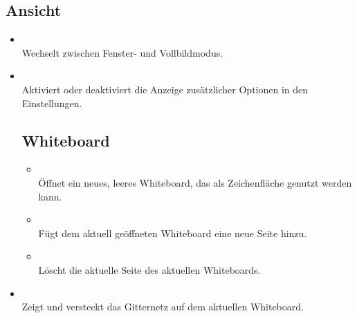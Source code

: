 \subsection{Ansicht}
\begin{itemize}
\item {}\\Wechselt zwischen Fenster- und Vollbildmodus.
\item {}\\Aktiviert oder deaktiviert die Anzeige zusätzlicher Optionen in den Einstellungen.
\subsection{Whiteboard}
\begin{itemize}
\item {}\\Öffnet ein neues, leeres Whiteboard, das als Zeichenfläche genutzt werden kann.
\item {}\\Fügt dem aktuell geöffneten Whiteboard eine neue Seite hinzu.
\item {}\\Löscht die aktuelle Seite des aktuellen Whiteboards.
\end{itemize}
\item {}\\Zeigt und versteckt das Gitternetz auf dem aktuellen Whiteboard.
\end{itemize}
